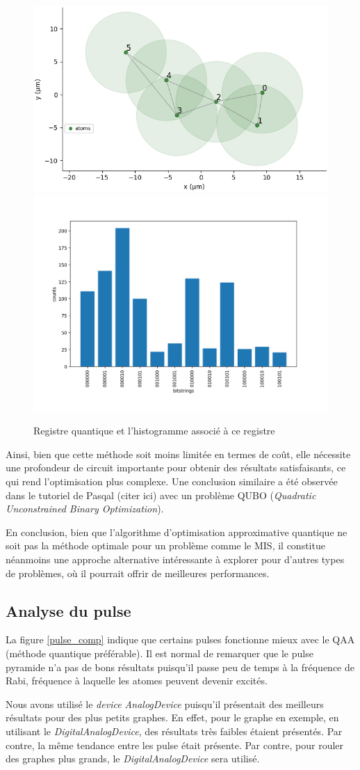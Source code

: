 \documentclass[11pt]{article}
\begin{document}
\begin{figure}[H]
    \centering
    \includegraphics[width = 0.48\linewidth]{images/registre_exemple2.png}
    \includegraphics[width=0.49\linewidth]{images/histogram_exemple2.png}
    \caption{Registre quantique et l'histogramme associé à ce registre}
    \label{QMIS_exemple}
\end{figure}

Ainsi, bien que cette méthode soit moins limitée en termes de coût, elle nécessite une profondeur de circuit importante pour obtenir des résultats satisfaisants, ce qui rend l'optimisation plus complexe. Une conclusion similaire a été observée dans le tutoriel de Pasqal (citer ici) avec un problème QUBO (\textit{Quadratic Unconstrained Binary Optimization}).

En conclusion, bien que l'algorithme d'optimisation approximative quantique ne soit pas la méthode optimale pour un problème comme le MIS, il constitue néanmoins une approche alternative intéressante à explorer pour d'autres types de problèmes, où il pourrait offrir de meilleures performances.

\subsection{Analyse du pulse}
La figure \ref{pulse_comp} indique que certains pulses fonctionne mieux avec le QAA (méthode quantique préférable). Il est normal de remarquer que le pulse pyramide n'a pas de bons résultats puisqu'il passe peu de temps à la fréquence de Rabi, fréquence à laquelle les atomes peuvent devenir excités.


Nous avons utilisé le \textit{device AnalogDevice} puisqu'il présentait des meilleurs résultats pour des plus petits graphes. En effet, pour le graphe en exemple, en utilisant le \textit{DigitalAnalogDevice}, des résultats très faibles étaient présentés. Par contre, la même tendance entre les pulse était présente. Par contre, pour rouler des graphes plus grands, le \textit{DigitalAnalogDevice} sera utilisé.
\end{document}
